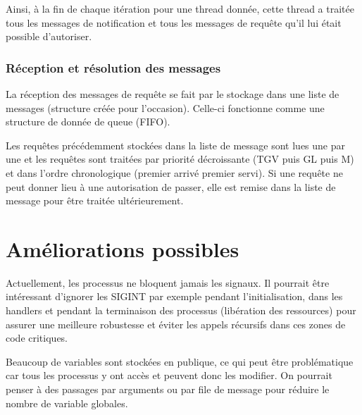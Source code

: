 \documentclass[a4paper,12pt]{article}
\begin{document}
Ainsi, à la fin de chaque itération pour une thread donnée, cette thread a traitée tous les messages de notification et tous les messages de requête qu'il lui était possible d'autoriser.

\subsubsection{Réception et résolution des messages}

La réception des messages de requête se fait par le stockage dans une liste de messages (structure créée pour l'occasion). Celle-ci fonctionne comme une structure de donnée de queue (FIFO).

Les requêtes précédemment stockées dans la liste de message sont lues une par une et les requêtes sont traitées par priorité décroissante (TGV puis GL puis M) et dans l'ordre chronologique (premier arrivé premier servi). Si une requête ne peut donner lieu à une autorisation de passer, elle est remise dans la liste de message pour être traitée ultérieurement.

\section{Améliorations possibles}

Actuellement, les processus ne bloquent jamais les signaux. Il pourrait être intéressant d'ignorer les SIGINT par exemple pendant l'initialisation, dans les handlers et pendant la terminaison des processus (libération des ressources) pour assurer une meilleure robustesse et éviter les appels récursifs dans ces zones de code critiques.

Beaucoup de variables sont stockées en publique, ce qui peut être problématique car tous les processus y ont accès et peuvent donc les modifier. On pourrait penser à des passages par arguments ou par file de message pour réduire le nombre de variable globales.
\end{document}
